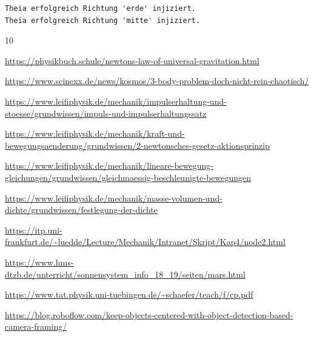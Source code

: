 \documentclass[11pt]{article}
\begin{document}
    \begin{Verbatim}[commandchars=\\\{\}]
Theia erfolgreich Richtung 'erde' injiziert.
Theia erfolgreich Richtung 'mitte' injiziert.
    \end{Verbatim}


\begin{thebibliography}{10} %

\url{https://physikbuch.schule/newtons-law-of-universal-gravitation.html}

\url{https://www.scinexx.de/news/kosmos/3-body-problem-doch-nicht-rein-chaotisch/}

\url{https://www.leifiphysik.de/mechanik/impulserhaltung-und-stoesse/grundwissen/impuls-und-impulserhaltungssatz}

\url{https://www.leifiphysik.de/mechanik/kraft-und-bewegungsaenderung/grundwissen/2-newtonsches-gesetz-aktionsprinzip}

\url{https://www.leifiphysik.de/mechanik/lineare-bewegung-gleichungen/grundwissen/gleichmaessig-beschleunigte-bewegungen}

\url{https://www.leifiphysik.de/mechanik/masse-volumen-und-dichte/grundwissen/festlegung-der-dichte}

\url{https://itp.uni-frankfurt.de/~luedde/Lecture/Mechanik/Intranet/Skript/Kap4/node2.html}

\url{https://www.hms-dtzb.de/unterricht/sonnensystem_info_18_19/seiten/mars.html}

\url{https://www.tat.physik.uni-tuebingen.de/~schaefer/teach/f/cp.pdf}

\url{https://blog.roboflow.com/keep-objects-centered-with-object-detection-based-camera-framing/}

\end{thebibliography}

    
    
    
\end{document}
